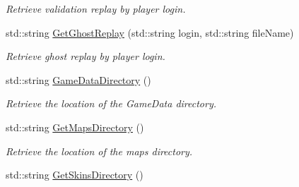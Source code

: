 \begin{DoxyCompactItemize}
\begin{DoxyCompactList}\small\item\em Retrieve validation replay by player login. \end{DoxyCompactList}\item 
std\-::string \hyperlink{classMethods_a517117fc33a06aaef7d1147635e93af4}{Get\-Ghost\-Replay} (std\-::string login, std\-::string file\-Name)
\begin{DoxyCompactList}\small\item\em Retrieve ghost replay by player login. \end{DoxyCompactList}\item 
\hypertarget{classMethods_ae3222ad3237a4871fca7e18ae9c55793}{std\-::string \hyperlink{classMethods_ae3222ad3237a4871fca7e18ae9c55793}{Game\-Data\-Directory} ()}\label{classMethods_ae3222ad3237a4871fca7e18ae9c55793}

\begin{DoxyCompactList}\small\item\em Retrieve the location of the Game\-Data directory. \end{DoxyCompactList}\item 
\hypertarget{classMethods_a261a73ca3361f05b03a69d06e72e19cf}{std\-::string \hyperlink{classMethods_a261a73ca3361f05b03a69d06e72e19cf}{Get\-Maps\-Directory} ()}\label{classMethods_a261a73ca3361f05b03a69d06e72e19cf}

\begin{DoxyCompactList}\small\item\em Retrieve the location of the maps directory. \end{DoxyCompactList}\item 
\hypertarget{classMethods_a839ff140e340c0be9411fce27763e96e}{std\-::string \hyperlink{classMethods_a839ff140e340c0be9411fce27763e96e}{Get\-Skins\-Directory} ()}\label{classMethods_a839ff140e340c0be9411fce27763e96e}


\end{DoxyCompactItemize}
